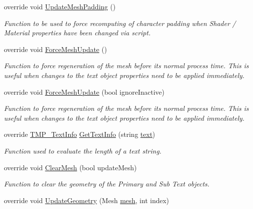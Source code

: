 \begin{DoxyCompactItemize}
\item 
override void \mbox{\hyperlink{class_t_m_pro_1_1_text_mesh_pro_a37394f39e8cdc5af63ecfa7286b5bdc3}{Update\+Mesh\+Padding}} ()
\begin{DoxyCompactList}\small\item\em Function to be used to force recomputing of character padding when Shader / Material properties have been changed via script. \end{DoxyCompactList}\item 
override void \mbox{\hyperlink{class_t_m_pro_1_1_text_mesh_pro_a3b4ae4094196a6522a70ac86cdb30e02}{Force\+Mesh\+Update}} ()
\begin{DoxyCompactList}\small\item\em Function to force regeneration of the mesh before its normal process time. This is useful when changes to the text object properties need to be applied immediately. \end{DoxyCompactList}\item 
override void \mbox{\hyperlink{class_t_m_pro_1_1_text_mesh_pro_adba5343dcc85a77bcd3dd57c22dd1753}{Force\+Mesh\+Update}} (bool ignore\+Inactive)
\begin{DoxyCompactList}\small\item\em Function to force regeneration of the mesh before its normal process time. This is useful when changes to the text object properties need to be applied immediately. \end{DoxyCompactList}\item 
override \mbox{\hyperlink{class_t_m_pro_1_1_t_m_p___text_info}{T\+M\+P\+\_\+\+Text\+Info}} \mbox{\hyperlink{class_t_m_pro_1_1_text_mesh_pro_a3652c1b48e8b425fc8a599aa05fad59e}{Get\+Text\+Info}} (string \mbox{\hyperlink{class_t_m_pro_1_1_t_m_p___text_a98a04e5078612c0586472bd510f91f5c}{text}})
\begin{DoxyCompactList}\small\item\em Function used to evaluate the length of a text string. \end{DoxyCompactList}\item 
override void \mbox{\hyperlink{class_t_m_pro_1_1_text_mesh_pro_ae306e084f9bdd5f374e9168d00fa0d17}{Clear\+Mesh}} (bool update\+Mesh)
\begin{DoxyCompactList}\small\item\em Function to clear the geometry of the Primary and Sub Text objects. \end{DoxyCompactList}\item 
override void \mbox{\hyperlink{class_t_m_pro_1_1_text_mesh_pro_a6be3d7406c8db74a978505697704df07}{Update\+Geometry}} (Mesh \mbox{\hyperlink{class_t_m_pro_1_1_text_mesh_pro_a2d197f964234bb89563b06b4614168f5}{mesh}}, int index)

\end{DoxyCompactItemize}
